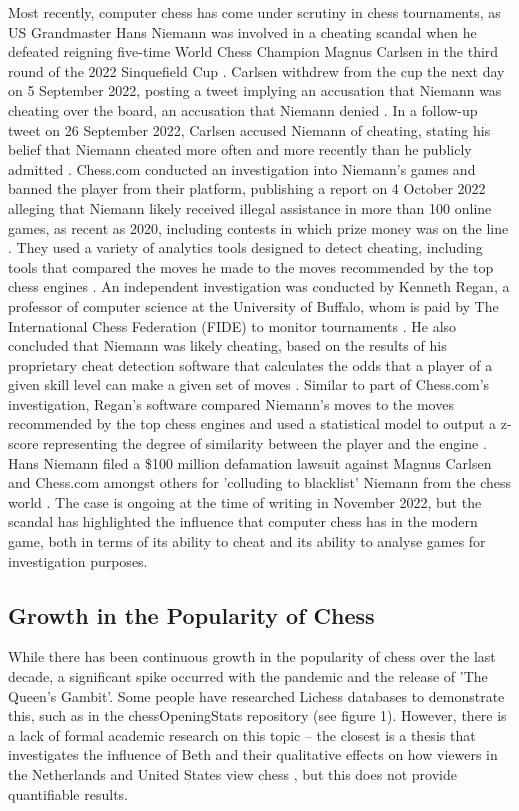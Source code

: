 \documentclass[%
 superscriptaddress,
showpacs,preprintnumbers,
 amsmath,
 amssymb,
 aps,
 pra,
showkeys,
onecolumn,
notitlepage,
11pt,
tightenlines      %
]{revtex4-1}
\begin{document}
Most recently, computer chess has come under scrutiny in chess tournaments, as US Grandmaster Hans Niemann was involved in a cheating scandal when he defeated reigning five-time World Chess Champion Magnus Carlsen in the third round of the 2022 Sinquefield Cup \cite{niemannDefeatsCarlsen}. Carlsen withdrew from the cup the next day on 5 September 2022, posting a tweet implying an accusation that Niemann was cheating over the board, an accusation that Niemann denied \cite{niemannCheatingAllegations}. In a follow-up tweet on 26 September 2022, Carlsen accused Niemann of cheating, stating his belief that Niemann cheated more often and more recently than he publicly admitted \cite{niemannCheatingAllegations2}. Chess.com conducted an investigation into Niemann's games and banned the player from their platform, publishing a report on 4 October 2022 alleging that Niemann likely received illegal assistance in more than 100 online games, as recent as 2020, including contests in which prize money was on the line \cite{niemannCheatingChessComReport}. They used a variety of analytics tools designed to detect cheating, including tools that compared the moves he made to the moves recommended by the top chess engines \cite{niemannCheatingChessComReport}. An independent investigation was conducted by Kenneth Regan, a professor of computer science at the University of Buffalo, whom is paid by The International Chess Federation (FIDE) to monitor tournaments \cite{niemannCheatingReganReport}. He also concluded that Niemann was likely cheating, based on the results of his proprietary cheat detection software that calculates the odds that a player of a given skill level can make a given set of moves \cite{niemannCheatingReganReport}. Similar to part of Chess.com's investigation, Regan's software compared Niemann's moves to the moves recommended by the top chess engines and used a statistical model to output a z-score representing the degree of similarity between the player and the engine \cite{niemannCheatingReganReport}. Hans Niemann filed a \$100 million defamation lawsuit against Magnus Carlsen and Chess.com amongst others for 'colluding to blacklist' Niemann from the chess world \cite{niemannCheatingDefamationLawsuit}. The case is ongoing at the time of writing in November 2022, but the scandal has highlighted the influence that computer chess has in the modern game, both in terms of its ability to cheat and its ability to analyse games for investigation purposes.

\subsection{Growth in the Popularity of Chess}
While there has been continuous growth in the popularity of chess over the last decade, a significant spike occurred with the pandemic and the release of 'The Queen's Gambit'. Some people have researched Lichess databases to demonstrate this, such as in the chessOpeningStats repository (see figure 1). However, there is a lack of formal academic research on this topic -- the closest is a thesis that investigates the influence of Beth and their qualitative effects on how viewers in the Netherlands and United States view chess \cite{lowie2021big}, but this does not provide quantifiable results.
\end{document}
